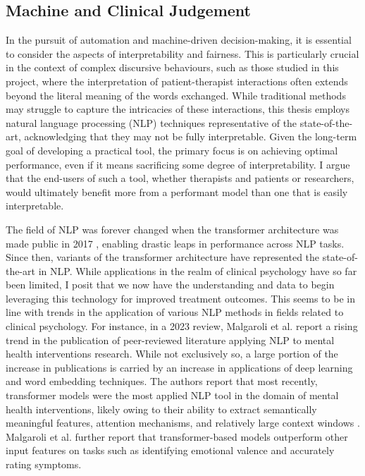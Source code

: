 \documentclass[12pt]{report}
\begin{document}
\subsection*{Machine and Clinical Judgement}
In the pursuit of automation and machine-driven decision-making, it is essential to consider the aspects of interpretability and fairness.
This is particularly crucial in the context of complex discursive behaviours, such as those studied in this project, where the interpretation of patient-therapist interactions often extends beyond the literal meaning of the words exchanged.
While traditional methods may struggle to capture the intricacies of these interactions, this thesis employs natural language processing (NLP) techniques representative of the state-of-the-art, acknowledging that they may not be fully interpretable.
Given the long-term goal of developing a practical tool, the primary focus is on achieving optimal performance, even if it means sacrificing some degree of interpretability.
I argue that the end-users of such a tool, whether therapists and patients or researchers, would ultimately benefit more from a performant model than one that is easily interpretable.

The field of NLP was forever changed when the transformer architecture was made public in 2017 \cite{Vaswani2017}, enabling drastic leaps in performance across NLP tasks.
Since then, variants of the transformer architecture have represented the state-of-the-art in NLP.
While applications in the realm of clinical psychology have so far been limited, I posit that we now have the understanding and data to begin leveraging this technology for improved treatment outcomes.
This seems to be in line with trends in the application of various NLP methods in fields related to clinical psychology.
For instance, in a 2023 review, Malgaroli et al. \citeyear{Malgaroli2023} report a rising trend in the publication of peer-reviewed literature applying NLP to mental health interventions research.
While not exclusively so, a large portion of the increase in publications is carried by an increase in applications of deep learning and word embedding techniques.
The authors report that most recently, transformer models were the most applied NLP tool in the domain of mental health interventions, likely owing to their ability to extract semantically meaningful features, attention mechanisms, and relatively large context windows \cite{Malgaroli2023}.
Malgaroli et al. further report that transformer-based models outperform other input features on tasks such as identifying emotional valence and accurately rating symptoms.
\end{document}
